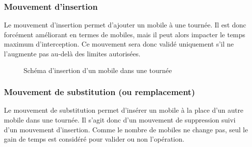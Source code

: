 		\subsubsection{Mouvement d'insertion}
			Le mouvement d'insertion permet d'ajouter un mobile à une tournée. Il est donc forcément améliorant en termes de mobiles, mais il peut alors impacter le temps maximum d'interception. Ce mouvement sera donc validé uniquement s'il ne l'augmente pas au-delà des limites autorisées.
			
			\begin{code}
				\begin{algo}[informal]
					\BEGIN
									\ENDIF
								\ENDFORGEN
							\ENDFORGEN
						\ENDFORGEN
					\END
				\end{algo}
			\end{code}
					
		
			\label{subs:move_insert}
			\begin{figure}[h!]
			\centering
			\begin{tikzpicture}[schema]
				
			\end{tikzpicture}
			\caption{Schéma d'insertion d'un mobile dans une tournée}
			\label{fig:move_insert}
			\end{figure}

		\subsubsection{Mouvement de substitution (ou remplacement)}
				Le mouvement de substitution permet d'insérer un mobile à la place d'un autre mobile dans une tournée. Il s'agit donc d'un mouvement de suppression suivi d'un mouvement d'insertion. Comme le nombre de mobiles ne change pas, seul le gain de temps est considéré pour valider ou non l'opération.
				
